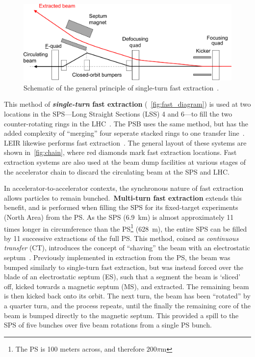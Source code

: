 \documentclass[11pt]{report}
\begin{document}
\begin{figure}[h]
  \centering
  \includegraphics[width=\linewidth]{fast.png}
  \caption{Schematic of the general principle of single-turn fast extraction~\cite{Fraser:CAS}.}\label{fig:fast_diagram}
\end{figure}

This method of \textbf{\textit{single-turn} fast extraction} (~\autoref{fig:fast_diagram}) is used at two locations in the SPS---Long Straight Sections (LSS) 4 and 6---to fill the two counter-rotating rings in the LHC~\cite{Fraser:CAS}. The PSB uses the same method, but has the added complexity of ``merging'' four seperate stacked rings to one transfer line~\cite{Metzmacher:2061508}. LEIR likewise performs fast extraction~\cite{Ghithan:2017wpd}. The general layout of these systems are shown in~\ref{fig:chain}, where red diamonds mark fast extraction locations. Fast extraction systems are also used at the beam dump facilities at various stages of the accelerator chain to discard the circulating beam at the SPS and LHC.

In accelerator-to-accelerator contexts, the synchronous nature of fast extraction allows particles to remain bunched.~\textbf{Multi-turn fast extraction} extends this benefit, and is performed when filling the SPS for its fixed-target experiments (North Area) from the PS. As the SPS (\qty{6.9}{km}) is almost approximately 11 times longer in circumference than the PS\footnote{The PS is 100 meters across, and therefore $200\pi$\si{m}} (\qty{628}{m}), the entire SPS can be filled by 11 successive extractions of the full PS. This method, coined as \textit{continuous transfer} (CT), introduces the concept of ``shaving'' the beam with an electrostatic septum~\cite{PhysRevSTAB.14.030101}. Previously implemented in extraction from the PS, the beam was bumped similarly to single-turn fast extraction, but was instead forced over the blade of an electrostatic septum (ES), such that a segment the beam is `sliced' off, kicked towards a magnetic septum (MS), and extracted. The remaining beam is then kicked back onto its orbit. The next turn, the beam has been ``rotated'' by a quarter turn, and the process repeats, until the finally the remaining core of the beam is bumped directly to the magnetic septum. This provided a spill to the SPS of five bunches over five beam rotations from a single PS bunch.
\end{document}

